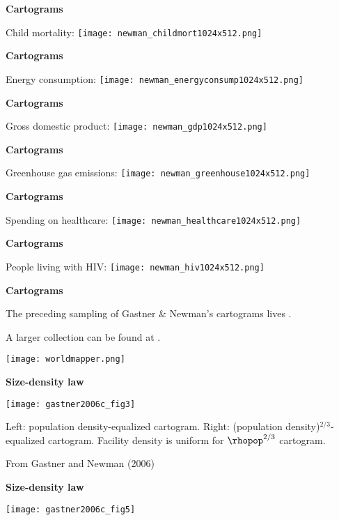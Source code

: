  


  \textbf{Cartograms}

  Child mortality:
  \texttt{[image: newman\_childmort1024x512.png]}


  \textbf{Cartograms}

  Energy consumption:
  \texttt{[image: newman\_energyconsump1024x512.png]}

  \textbf{Cartograms}

  Gross domestic product:
  \texttt{[image: newman\_gdp1024x512.png]}

  \textbf{Cartograms}

  Greenhouse gas emissions:
  \texttt{[image: newman\_greenhouse1024x512.png]}

  \textbf{Cartograms}

  Spending on healthcare:
  \texttt{[image: newman\_healthcare1024x512.png]}

  \textbf{Cartograms}
  
  People living with HIV:
  \texttt{[image: newman\_hiv1024x512.png]}


  \textbf{Cartograms}

  
   The preceding sampling of Gastner \& Newman's cartograms
    lives .
  
    A larger collection can be found
    at .

    \bigskip

    \texttt{[image: worldmapper.png]}
  


  \textbf{Size-density law}

  \texttt{[image: gastner2006c\_fig3]}

  
    \alert{Left:} population density-equalized cartogram.
    \alert{Right:} (population density)$^{2/3}$-equalized cartogram.
    Facility density is uniform for $\rhopop^{2/3}$ cartogram.
  
  {\small
    From Gastner and Newman (2006)\cite{gastner2006c}
  }

  \textbf{Size-density law}

  \texttt{[image: gastner2006c\_fig5]}

